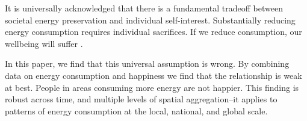 \documentclass[10pt, letterpaper]{article}
\begin{document}
\begin{spacing}{1.4}
It is universally acknowledged that there is a fundamental tradeoff between
societal energy preservation and individual self-interest. Substantially reducing
energy consumption requires individual sacrifices. If we reduce consumption, our wellbeing will
suffer \cite{kenny_businessweek_aug_29_14, gordon_wsj_may_29_14, carter_pbs_apr_18_77,smil05}. 





In this paper, we find that this universal assumption is wrong.  By combining
data on energy consumption and happiness we find that the
relationship is weak at best. %
 People in areas consuming more energy are not happier.
This finding is robust across time, and multiple levels of spatial aggregation--it applies to patterns of energy consumption  at the local, national, and global scale.  



\end{spacing}
\end{document}
